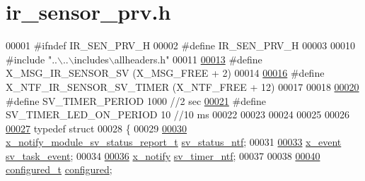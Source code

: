 \hypertarget{a00023_source}{\section{ir\+\_\+sensor\+\_\+prv.\+h}
\label{a00023_source}
}

\begin{DoxyCode}
00001 \textcolor{preprocessor}{#ifndef IR\_SEN\_PRV\_H}
00002 \textcolor{preprocessor}{#define IR\_SEN\_PRV\_H}
00003 
00010 \textcolor{preprocessor}{#include "..\(\backslash\)..\(\backslash\)includes\(\backslash\)allheaders.h"} 
00011 
\hypertarget{a00023_source_l00013}{}\hyperlink{a00023_a16b09a45fdc504b8b00d634b49c820b4}{00013} \textcolor{preprocessor}{#define X\_MSG\_IR\_SENSOR\_SV                                          (X\_MSG\_FREE + 2)}
00014 
\hypertarget{a00023_source_l00016}{}\hyperlink{a00023_a3b0f15b601361fafa871c5e49df7842d}{00016} \textcolor{preprocessor}{#define X\_NTF\_IR\_SENSOR\_SV\_TIMER                                    (X\_NTF\_FREE + 12)}
00017 
00018 
\hypertarget{a00023_source_l00020}{}\hyperlink{a00023_a8a535456285f4602701c814d7b69cc68}{00020} \textcolor{preprocessor}{#define SV\_TIMER\_PERIOD                                             1000  //2 sec}
\hypertarget{a00023_source_l00021}{}\hyperlink{a00023_a44e4917fdf9d2a3574a3dd34537d97a7}{00021} \textcolor{preprocessor}{#define SV\_TIMER\_LED\_ON\_PERIOD                                      10    //10 ms}
00022 
00023 
00024 
00025 
00026 
\hypertarget{a00023_source_l00027}{}\hyperlink{a00023}{00027} \textcolor{keyword}{typedef} \textcolor{keyword}{struct}
00028 \{
00029 
\hypertarget{a00023_source_l00030}{}\hyperlink{a00023_afdc0e2c51e8e301d264700f4f9c10740}{00030}       \hyperlink{a00021_d7/d1b/a00864}{x\_notify\_module\_sv\_status\_report\_t}         
      \hyperlink{a00023_afdc0e2c51e8e301d264700f4f9c10740}{sv\_status\_ntf};
00031 
\hypertarget{a00023_source_l00033}{}\hyperlink{a00023_a43c345f39ea3aefbb60ef1ef57fe5d83}{00033}       \hyperlink{a00036_de/d37/a00849}{x\_event}                         \hyperlink{a00023_a43c345f39ea3aefbb60ef1ef57fe5d83}{sv\_task\_event};
00034 
\hypertarget{a00023_source_l00036}{}\hyperlink{a00023_ada91b200053f2d93e3639dc4ee3415b4}{00036}       \hyperlink{a00036_df/d4c/a00851}{x\_notify}                                   \hyperlink{a00023_ada91b200053f2d93e3639dc4ee3415b4}{sv\_timer\_ntf};
00037 
00038 
\hypertarget{a00023_source_l00040}{}\hyperlink{a00023_a94b2d1f6ea4ab334c74d24984dd27843}{00040}       \hyperlink{a00021_d6/d9c/a00352}{configured\_t}                               \hyperlink{a00023_a94b2d1f6ea4ab334c74d24984dd27843}{configured};

\end{DoxyCode}
